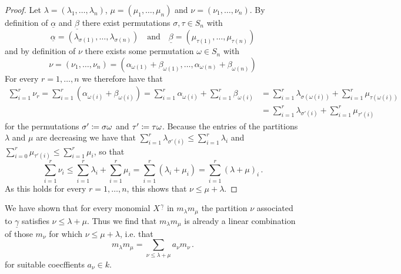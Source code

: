 \begin{fluff}
  \begin{proof}
    Let $\lambda = (\lambda_1, \dotsc, \lambda_n)$,  $\mu = (\mu_1, \dotsc, \mu_n)$ and $\nu = (\nu_1, \dotsc, \nu_n)$.
    By definition of $\underline{\alpha}$ and $\underline{\beta}$ there exist permutations $\sigma, \tau \in S_n$ with
    \[
        \underline{\alpha}
      = ( \lambda_{\sigma(1)}, \dotsc, \lambda_{\sigma(n)} )
      \quad\text{and}\quad
        \underline{\beta}
      = ( \mu_{\tau(1)}, \dotsc, \mu_{\tau(n)} )
    \]
    and by definition of $\nu$ there exists some permutation $\omega \in S_n$ with
    \[
        \nu
      = (\nu_1, \dotsc, \nu_n)
      = (\alpha_{\omega(1)} + \beta_{\omega(1)},
         \dotsc,
         \alpha_{\omega(n)} + \beta_{\omega(n)})
    \]
    For every $r = 1, \dotsc, n$ we therefore have that
    \begin{align*}
          \sum_{i=1}^r \nu_r
       =  \sum_{i=1}^r ( \alpha_{\omega(i)} + \beta_{\omega(i)} )
       =    \sum_{i=1}^r \alpha_{\omega(i)}
          + \sum_{i=1}^r \beta_{\omega(i)}
      &=    \sum_{i=1}^r \lambda_{\sigma(\omega(i))}
          + \sum_{i=1}^r \mu_{\tau(\omega(i))}  \\
      &=    \sum_{i=1}^r \lambda_{\sigma'(i)}
          + \sum_{i=1}^r \mu_{\tau'(i)}
    \end{align*}
    for the permutations $\sigma' \coloneqq \sigma \omega$ and $\tau' \coloneqq \tau \omega$.
    Because the entries of the partitions $\lambda$ and $\mu$ are decreasing we have that $\sum_{i=1}^r \lambda_{\sigma'(i)} \leq \sum_{i=1}^r \lambda_i$ and $\sum_{i=0}^r \mu_{\tau'(i)} \leq \sum_{i=1}^r \mu_i$, so that
    \[
            \sum_{i=1}^r \nu_i
      \leq    \sum_{i=1}^r \lambda_i
            + \sum_{i=1}^r \mu_i
      =     \sum_{i=1}^r (\lambda_i + \mu_i)
      =     \sum_{i=1}^r (\lambda + \mu)_i \,.
    \]
    As this holds for every $r = 1, \dotsc, n$, this shows that $\nu \leq \mu + \lambda$.
  \end{proof}
  
  We have shown that for every monomial $X^{\,\underline{\gamma}}$ in $m_\lambda m_\mu$ the partition $\nu$ associated to $\underline{\gamma}$ satisfies $\nu \leq \lambda + \mu$.
  Thus we find that $m_\lambda m_\mu$ is already a linear combination of those $m_\nu$ for which $\nu \leq \mu + \lambda$, i.e. that
  \[
      m_\lambda m_\mu
    = \sum_{\nu \leq \lambda + \mu} a_\nu m_\nu \,.
  \]
  for suitable coecffients $a_\nu \in k$.
  

\end{fluff}
